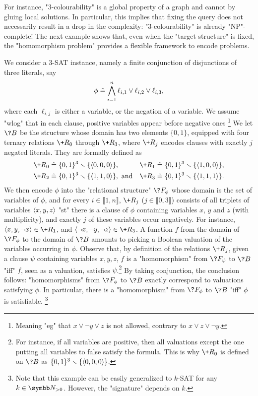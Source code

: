 For instance, "$3$-colourability" is a global property of a graph and cannot by gluing local 
solutions. In particular, this implies that fixing the query does not necessarily result in
a drop in the complexity: "$3$-colourability" is already "NP"-complete!
The next example shows that, even when the "target structure" is fixed, the "homomorphism problem"
provides a flexible framework to encode problems.

\begin{example}
	\AP\label{ex:sat-as-hom}
	We consider a 3-SAT instance, namely a finite conjunction of
	disjunctions of three literals, say
	\[
		\phi \mathrel{\hat{=}} \bigwedge_{i=1}^n \ell_{i,1} \lor \ell_{i,2} \lor \ell_{i,3},
	\]
	where each $\ell_{i,j}$ is either a variable, or the negation of a variable.
	We assume "wlog" that in each clause, positive variables appear before negative ones%
	\footnote{Meaning "eg" that $x \lor \neg y \lor z$ is not allowed, contrary to
	$x \lor z \lor \neg y$.}
	We let $\?B$ be the structure whose domain has two elements $\{0,1\}$,
	equipped with four ternary relations $\+R_0$ through $\+R_3$, where $\+R_j$ encodes clauses with exactly $j$ negated literals. They are formally defined as
	\begin{align*}
		\+R_0 & \defeq \set{0,1}^3 \smallsetminus \set{\tup{0,0,0}}, &
		\+R_1 & \defeq \set{0,1}^3 \smallsetminus \set{\tup{1,0,0}}, \\
		\+R_2 & \defeq \set{0,1}^3 \smallsetminus \set{\tup{1,1,0}}, \text{ and} &
		\+R_3 & \defeq \set{0,1}^3 \smallsetminus \set{\tup{1,1,1}}.
	\end{align*}
	We then encode $\phi$ into the "relational structure" $\?F_\phi$
	whose domain is the set of variables of $\phi$,
	and for every $i \in \lBrack 1,n \rBrack$,
	$\+R_j$ ($j\in\lBrack 0,3\rBrack$) consists of all triplets of variables $\langle x,y,z\rangle$
	"st" there is a clause of $\phi$ containing variables $x$, $y$ and $z$ (with multiplicity), and exactly $j$ of these variables occur negatively.
	For instance, $\tup{x, y, \neg x} \in \+R_1$, and $\tup{\neg x, \neg y, \neg z} \in \+R_3$.
	A function $f$ from the domain of $\?F_\phi$ to the domain of $\?B$ amounts to picking
	a Boolean valuation of the variables occurring in $\phi$.
	Observe that, by definition of the relations $\+R_j$,
	given a clause $\psi$ containing variables $x,y,z$, 
	$f$ is a "homomorphism" from $\?F_\psi$ to $\?B$ "iff"
	$f$, seen as a valuation, satisfies $\psi$.\footnote{For instance,
	if all variables are positive, then all valuations except the one putting
	all variables to false satisfy the formula. This is why $\+R_0$ is defined
	on $\?B$ as $\{0,1\}^3\smallsetminus \{\langle0,0,0\rangle\}$.}
	By taking conjunction, the conclusion follows: "homomorphisms" from
	$\?F_\phi$ to $\?B$ exactly correspond to valuations satisfying $\phi$.
	In particular, there is a "homomorphism" from $\?F_\phi$ to $\?B$ "iff"
	$\phi$ is satisfiable.%
	\footnote{Note that this example can be easily generalized to $k$-SAT for any $k\in\Np$.
	However, the "signature" depends on $k$.}
\end{example}

